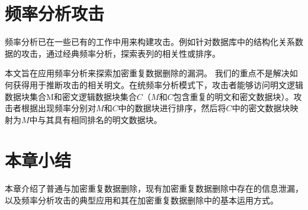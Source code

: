 \section{频率分析攻击}

频率分析已在一些已有的工作中用来构建攻击。例如针对数据库中的结构化关系数据的攻击，通过经典频率分析，探索表列的相关性或排序。

本文旨在应用频率分析来探索加密重复数据删除的漏洞。 我们的重点不是解决如何获得用于推断攻击的相关明文。在统频率分析模式下，攻击者能够访问明文逻辑数据块集合M和密文逻辑数据块集合$C$（$M$和$C$包含重复的明文和密文数据块）。攻击者根据出现频率分别对$M$和$C$中的数据块进行排序，然后将$C$中的密文数据块映射为$M$中与其具有相同排名的明文数据块。

\section{本章小结}

本章介绍了普通与加密重复数据删除，现有加密重复数据删除中存在的信息泄漏，以及频率分析攻击的典型应用和其在加密重复数据删除中的基本运用方式。
